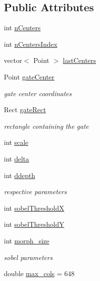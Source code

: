 \subsection*{Public Attributes}
\begin{DoxyCompactItemize}
\item 
int \hyperlink{classGateDetector_a3d49703c7ba15e0e1fe7b08350fa8017}{n\+Centers}
\item 
int \hyperlink{classGateDetector_a27ea44bd6f8d3d091418f677a7fdf197}{n\+Centers\+Index}
\item 
vector$<$ Point $>$ \hyperlink{classGateDetector_ad395280c51d04b4225609fc53f4e0c00}{last\+Centers}
\item 
Point \hyperlink{classGateDetector_af7c6c03cabdcf80173ac28ffc3a48d0c}{gate\+Center}
\begin{DoxyCompactList}\small\item\em gate center coordinates \end{DoxyCompactList}\item 
Rect \hyperlink{classGateDetector_aca9cf954786aeb5a0df7f7ed095b15ec}{gate\+Rect}
\begin{DoxyCompactList}\small\item\em rectangle containing the gate \end{DoxyCompactList}\item 
int \hyperlink{classGateDetector_ab8d04467e6fef95ccd54c01796c0a337}{scale}
\item 
int \hyperlink{classGateDetector_a1f21719afcda03c5ffbee39e9ce1fa90}{delta}
\item 
int \hyperlink{classGateDetector_a2da9b04c7980d392ea0bcde4b33699ab}{ddepth}
\begin{DoxyCompactList}\small\item\em respective parameters \end{DoxyCompactList}\item 
int \hyperlink{classGateDetector_a2279feb12600170f8340dfdc123a9165}{sobel\+ThresholdX}
\item 
int \hyperlink{classGateDetector_ac39590c247ad5e79466e3ce419a273d7}{sobel\+ThresholdY}
\item 
int \hyperlink{classGateDetector_ac31f77e36cc6ec62aa4b975e6b883f69}{morph\+\_\+size}
\begin{DoxyCompactList}\small\item\em sobel parameters \end{DoxyCompactList}\item 
double \hyperlink{classGateDetector_a735ed4a366a55021e9e9d28c749f6b8e}{max\+\_\+cols} = 648

\end{DoxyCompactItemize}

